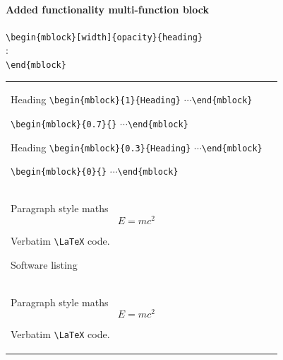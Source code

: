 \documentclass[10pt,aspectratio=169]{beamer}
\begin{document}
\begin{frame}[fragile]

\framesubtitle{Added functionality multi-function block}

\vspace*{-3ex}
\color{black}
\footnotesize
\verb|\begin{mblock}[width]{opacity}{heading}|\\
\hspace*{2em}:\\[1ex]
\verb|\end{mblock}|\\
\tiny
\begin{tabular}{p{}@{\hspace*{0.5cm}}p{}}

\begin{mblock}{1}{Heading}
\verb|\begin{mblock}{1}{Heading}|
$\cdots$\verb|\end{mblock}|
\end{mblock}

\begin{mblock}{0.7}{}
\verb|\begin{mblock}{0.7}{}|
$\cdots$\verb|\end{mblock}|
\end{mblock}

\begin{mblock}{0.3}{Heading}
\verb|\begin{mblock}{0.3}{Heading}|
$\cdots$\verb|\end{mblock}|
\end{mblock}

\begin{mblock}{0}{}
\verb|\begin{mblock}{0}{}|
$\cdots$\verb|\end{mblock}|
\end{mblock}

& 

\begin{mblock}{1}{Mass--energy equivalence}{
Use the \textsl{mblock} environment for:
\begin{itemize}
\item Inline maths: $E = mc^2$\\
\item Paragraph style maths \[E = mc^2\]
\item Verbatim \verb|\LaTeX| code.
\item Software listing
\begin{verbatim}
\begin{itemize}
\item Inline maths: $E = mc^2$\\
\item Paragraph style maths \[E = mc^2\]
\item Verbatim \verb|\LaTeX| code.
\end{itemize}
\end{verbatim}
\end{itemize}
}
\end{mblock}
\end{tabular}
\end{frame}
\end{document}
